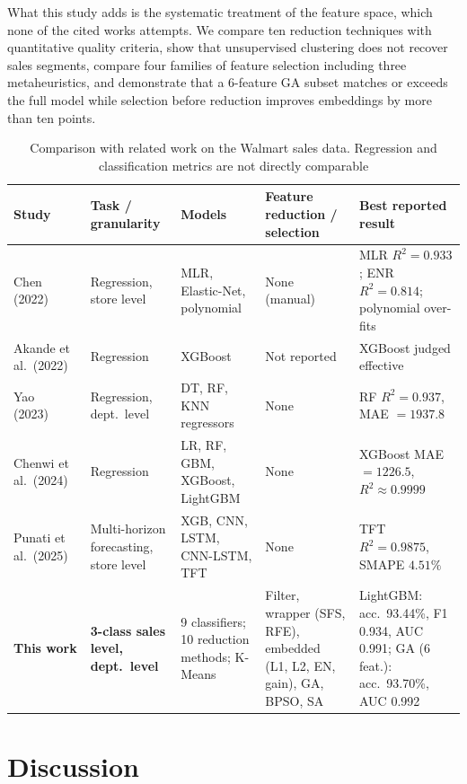 What this study adds is the systematic treatment of the feature space, which none of the cited works attempts. We compare ten reduction techniques with quantitative quality criteria, show that unsupervised clustering does not recover sales segments, compare four families of feature selection including three metaheuristics, and demonstrate that a 6-feature GA subset matches or exceeds the full model while selection before reduction improves embeddings by more than ten points.

\begin{table}[!t]
\caption{Comparison with related work on the Walmart sales data. Regression and classification metrics are not directly comparable}
\label{tab:related}
\centering
\begin{tabular}{p{2.6cm}p{2.6cm}p{3.4cm}p{3.1cm}p{4.2cm}}
\toprule
Study & Task / granularity & Models & Feature reduction / selection & Best reported result \\
\midrule
Chen (2022)~\cite{chen2022} & Regression, store level & MLR, Elastic-Net, polynomial & None (manual) & MLR $R^2=0.933$; ENR $R^2=0.814$; polynomial over-fits \\
Akande et al.\ (2022)~\cite{akande2022} & Regression & XGBoost & Not reported & XGBoost judged effective \\
Yao (2023)~\cite{yao2023} & Regression, dept.\ level & DT, RF, KNN regressors & None & RF $R^2=0.937$, MAE $=1937.8$ \\
Chenwi et al.\ (2024)~\cite{chenwi2024} & Regression & LR, RF, GBM, XGBoost, LightGBM & None & XGBoost MAE $=1226.5$, $R^2\approx0.9999$ \\
Punati et al.\ (2025)~\cite{punati2025} & Multi-horizon forecasting, store level & XGB, CNN, LSTM, CNN-LSTM, TFT & None & TFT $R^2=0.9875$, SMAPE $4.51\%$ \\
\midrule
\textbf{This work} & \textbf{3-class sales level, dept.\ level} & 9 classifiers; 10 reduction methods; K-Means & Filter, wrapper (SFS, RFE), embedded (L1, L2, EN, gain), GA, BPSO, SA & LightGBM: acc.\ 93.44\%, F1 0.934, AUC 0.991; GA (6 feat.): acc.\ 93.70\%, AUC 0.992 \\
\bottomrule
\end{tabular}
\end{table}

\section{Discussion}\label{sec:discussion}
